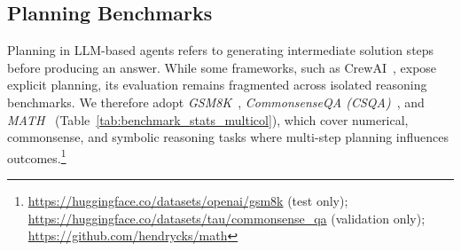 



\vspace{-1.5mm}
\subsection{Planning Benchmarks}
\label{subsec:bench_planning}

Planning in LLM-based agents refers to generating intermediate solution steps before producing an answer. While some frameworks, such as CrewAI~\cite{crewai2025}, expose explicit planning, its evaluation remains fragmented across isolated reasoning benchmarks. We therefore adopt \emph{GSM8K}~\cite{cobbe2021training}, \emph{CommonsenseQA (CSQA)}~\cite{talmor-etal-2019-commonsenseqa}, and \emph{MATH}~\cite{hendrycks2measuring} (Table~\ref{tab:benchmark_stats_multicol}), which cover numerical, commonsense, and symbolic reasoning tasks where multi-step planning influences outcomes.\footnote{\url{https://huggingface.co/datasets/openai/gsm8k} (test only); \url{https://huggingface.co/datasets/tau/commonsense_qa} (validation only); \url{https://github.com/hendrycks/math}}

